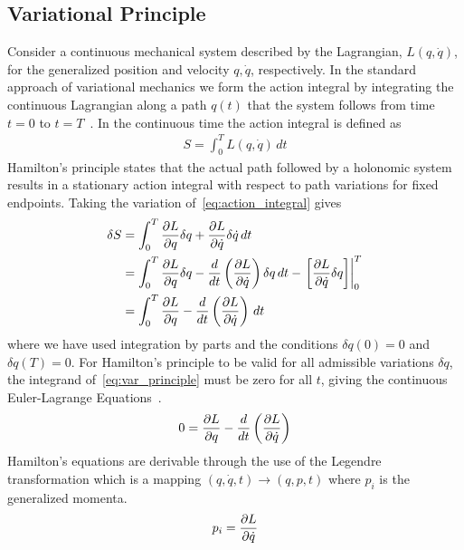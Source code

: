 \documentclass[letterpaper, preprint, paper,11pt]{AAS}	%
\begin{document}
\subsection{Variational Principle}
Consider a continuous mechanical system described by the Lagrangian, \( L( q, \dot{q} ) \), for the generalized position and velocity \( q, \dot{q} \), respectively.
In the standard approach of variational mechanics we form the action integral by integrating the continuous Lagrangian along a path \( q(t) \) that the system follows from time \( t = 0 \) to \( t = T \)~\cite{greenwood1988}.
In the continuous time the action integral is defined as
\begin{align}\label{eq:action_integral}
	S = \int_{0}^T L\left( q, \dot{q}\right) \, dt
\end{align}
Hamilton's principle states that the actual path followed by a holonomic system results in a stationary action integral with respect to path variations for fixed endpoints.
Taking the variation of~\cref{eq:action_integral} gives
\begin{subequations}
\begin{align}\label{eq:var_principle}
	\delta S &= \int_{0}^T \deriv{L}{q} \delta q + \deriv{L}{\dot{q}} \delta \dot{q} \, dt \\
		&= \int_{0}^T \deriv{L}{q} \delta q - \frac{d}{dt} \left( \deriv{L}{\dot{q}}\right) \delta q \, dt - \left. \left[ \deriv{L}{\dot{q}} \delta q\right] \right|_0^T \\
	&= \int_{0}^T \deriv{L}{q} - \frac{d}{dt} \left( \deriv{L}{\dot{q}}	\right) \, dt
\end{align}
\end{subequations} 
where we have used integration by parts and the conditions \( \delta q(0) = 0 \) and \( \delta q(T) = 0\).
For Hamilton's principle to be valid for all admissible variations \( \delta q \), the integrand of~\cref{eq:var_principle} must be zero for all \( t\), giving the continuous Euler-Lagrange Equations~\cite{lanczos1970}.
\begin{align}\label{eq:euler-lagrange}
	0 = \deriv{L}{q} - \frac{d}{dt} \left( \deriv{L}{\dot{q}} \right) 
\end{align}
Hamilton's equations are derivable through the use of the Legendre transformation which is a mapping \( \left( q, \dot{q},t\right) \rightarrow \left(q, p, t \right) \) where \( p_i\) is the generalized momenta.
\begin{align}\label{eq:legendre_transform}
	p_i = \deriv{L}{\dot{q}}
\end{align}
\end{document}
